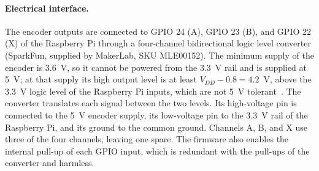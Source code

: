 \paragraph{Electrical interface.}
The encoder outputs are connected to GPIO 24 (A), GPIO 23 (B), and GPIO 22 (X) of the Raspberry Pi through a four-channel bidirectional logic level converter (SparkFun, supplied by MakerLab, SKU MLE00152). The minimum supply of the encoder is 3.6~V, so it cannot be powered from the 3.3~V rail and is supplied at 5~V; at that supply its high output level is at least $V_{DD} - 0.8 = 4.2$~V, above the 3.3~V logic level of the Raspberry Pi inputs, which are not 5~V tolerant~\citep{raspberrypi2024}. The converter translates each signal between the two levels. Its high-voltage pin is connected to the 5~V encoder supply, its low-voltage pin to the 3.3~V rail of the Raspberry Pi, and its ground to the common ground. Channels A, B, and X use three of the four channels, leaving one spare. The firmware also enables the internal pull-up of each GPIO input, which is redundant with the pull-ups of the converter and harmless.

